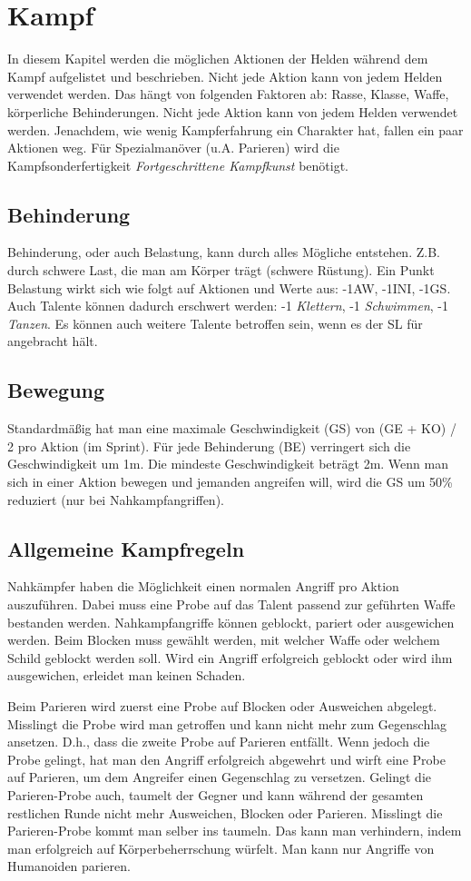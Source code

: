{\let\clearpage\relax\chapter{Kampf}}
In diesem Kapitel werden die möglichen Aktionen der Helden während dem Kampf aufgelistet und beschrieben. Nicht jede Aktion kann von jedem Helden verwendet werden. Das hängt von folgenden Faktoren ab: Rasse, Klasse, Waffe, körperliche Behinderungen. Nicht jede Aktion kann von jedem Helden verwendet werden. Jenachdem, wie wenig Kampferfahrung ein Charakter hat, fallen ein paar Aktionen weg. Für Spezialmanöver (u.A. Parieren) wird die Kampfsonderfertigkeit \textit{Fortgeschrittene Kampfkunst} benötigt.

\section{Behinderung}
Behinderung, oder auch Belastung, kann durch alles Mögliche entstehen. Z.B. durch schwere Last, die man am Körper trägt (schwere Rüstung). Ein Punkt Belastung wirkt sich wie folgt auf Aktionen und Werte aus: -1AW, -1INI, -1GS. Auch Talente können dadurch erschwert werden: -1 \textit{Klettern}, -1 \textit{Schwimmen}, -1 \textit{Tanzen}. Es können auch weitere Talente betroffen sein, wenn es der SL für angebracht hält.

\section{Bewegung}
Standardmäßig hat man eine maximale Geschwindigkeit (GS) von (GE + KO) / 2 pro Aktion (im Sprint). Für jede Behinderung (BE) verringert sich die Geschwindigkeit um 1m. Die mindeste Geschwindigkeit beträgt 2m. Wenn man sich in einer Aktion bewegen und jemanden angreifen will, wird die GS um 50\% reduziert (nur bei Nahkampfangriffen). 

\section{Allgemeine Kampfregeln}
Nahkämpfer haben die Möglichkeit einen normalen Angriff pro Aktion auszuführen. Dabei muss eine Probe auf das Talent passend zur geführten Waffe bestanden werden. Nahkampfangriffe können geblockt, pariert oder ausgewichen werden. Beim Blocken muss gewählt werden, mit welcher Waffe oder welchem Schild geblockt werden soll. Wird ein Angriff erfolgreich geblockt oder wird ihm ausgewichen, erleidet man keinen Schaden. 

Beim Parieren wird zuerst eine Probe auf Blocken oder Ausweichen abgelegt. Misslingt die Probe wird man getroffen und kann nicht mehr zum Gegenschlag ansetzen. D.h., dass die zweite Probe auf Parieren entfällt. Wenn jedoch die Probe gelingt, hat man den Angriff erfolgreich abgewehrt und wirft eine Probe auf Parieren, um dem Angreifer einen Gegenschlag zu versetzen. Gelingt die Parieren-Probe auch, taumelt der Gegner und kann während der gesamten restlichen Runde nicht mehr Ausweichen, Blocken oder Parieren. Misslingt die Parieren-Probe kommt man selber ins taumeln. Das kann man verhindern, indem man erfolgreich auf Körperbeherrschung würfelt. Man kann nur Angriffe von Humanoiden parieren.

